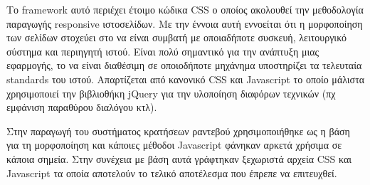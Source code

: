 Το framework αυτό περιέχει έτοιμο κώδικα CSS ο οποίος ακολουθεί την μεθοδολογία παραγωγής responsive ιστοσελίδων. Με την έννοια αυτή εννοείται ότι η μορφοποίηση των σελίδων στοχεύει στο να είναι συμβατή με οποιαδήποτε συσκευή, λειτουργικό σύστημα και περιηγητή ιστού. Είναι πολύ σημαντικό για την ανάπτυξη μιας εφαρμογής, το να είναι διαθέσιμη σε οποιοδήποτε μηχάνημα υποστηρίζει τα τελευταία standards του ιστού. Απαρτίζεται από κανονικό CSS και Javascript το οποίο μάλιστα χρησιμοποιεί την βιβλιοθήκη jQuery για την υλοποίηση διαφόρων τεχνικών (πχ εμφάνιση παραθύρου διαλόγου κτλ).

Στην παραγωγή του συστήματος κρατήσεων ραντεβού χρησιμοποιήθηκε ως η βάση για τη μορφοποίηση και κάποιες μέθοδοι Javascript φάνηκαν αρκετά χρήσιμα σε κάποια σημεία. Στην συνέχεια με βάση αυτά γράφτηκαν ξεχωριστά αρχεία CSS και Javascript τα οποία αποτελούν το τελικό αποτέλεσμα που έπρεπε να επιτευχθεί. 
